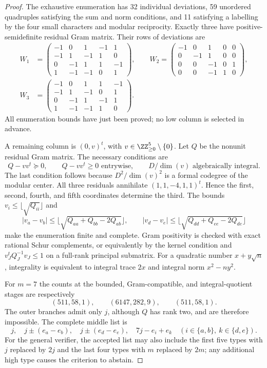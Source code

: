 \begin{proof}
The exhaustive enumeration has 32 individual deviations, 59 unordered
quadruples satisfying the sum and norm conditions, and 11 satisfying a
labelling by the four small characters and modular reciprocity.
Exactly three have positive-semidefinite residual Gram matrix.  Their
rows of deviations are
\[
\begin{split}
W_1&=\begin{pmatrix}-1&0&1&-1&1\\-1&1&-1&1&0\\0&-1&1&1&-1\\1&-1&-1&0&1\end{pmatrix},\qquad
W_2=\begin{pmatrix}-1&0&1&0&0\\0&-1&1&0&0\\0&0&-1&0&1\\0&0&-1&1&0\end{pmatrix},\\
W_3&=\begin{pmatrix}-1&0&1&1&-1\\-1&1&-1&0&1\\0&-1&1&-1&1\\1&-1&-1&1&0\end{pmatrix}.
\end{split}
\]
All enumeration bounds have just been proved; no low column is selected
in advance.

A remaining column is $(0,v)^t$, with $v\in\ZZ_{\ge0}^5\setminus\{0\}$.
Let $Q$ be the nonunit residual Gram matrix.  The necessary conditions are
\[
 Q-vv^t\succeq0,\qquad Q-vv^t\ge0\text{ entrywise},\qquad
 D/\dim(v)\text{ algebraically integral}.
\]
The last condition follows because $D^2/\dim(v)^2$ is a formal codegree
of the modular center.  All three residuals annihilate
$(1,1,-4,1,1)^t$.  Hence the first, second, fourth, and fifth coordinates
determine the third.  The bounds $v_i\le\lfloor\sqrt{Q_{ii}}\rfloor$ and
\[
 |v_a-v_b|\le\lfloor\sqrt{Q_{aa}+Q_{bb}-2Q_{ab}}\rfloor,
 \qquad
 |v_d-v_e|\le\lfloor\sqrt{Q_{dd}+Q_{ee}-2Q_{de}}\rfloor
\]
make the enumeration finite and complete.  Gram positivity is checked
with exact rational Schur complements, or equivalently by the kernel
condition and $v_J^tQ_J^{-1}v_J\le1$ on a full-rank principal submatrix.
For a quadratic number $x+y\sqrt n$, integrality is equivalent to integral
trace $2x$ and integral norm $x^2-ny^2$.

For $m=7$ the counts at the bounded, Gram-compatible, and integral-quotient
stages are respectively
\[
 (511,58,1),\qquad (6147,282,9),\qquad (511,58,1).
\]
The outer branches admit only $j$, although $Q$ has rank two, and are
therefore impossible.  The complete middle list is
\[
 j,\quad j\pm(e_a-e_b),\quad j\pm(e_d-e_e),\quad
 7j-e_i+e_k\quad(i\in\{a,b\},\ k\in\{d,e\}).
\]
For the general verifier, the accepted list may also include the first
five types with $j$ replaced by $2j$ and the last four types with $m$
replaced by $2m$; any additional high type causes the criterion to abstain.


\end{proof}
